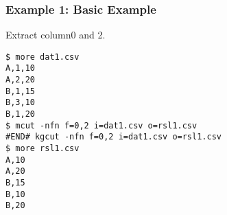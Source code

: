 \subsubsection*{Example 1: Basic Example}

Extract column0 and 2.


\begin{Verbatim}[baselinestretch=0.7,frame=single]
$ more dat1.csv
A,1,10
A,2,20
B,1,15
B,3,10
B,1,20
$ mcut -nfn f=0,2 i=dat1.csv o=rsl1.csv
#END# kgcut -nfn f=0,2 i=dat1.csv o=rsl1.csv
$ more rsl1.csv
A,10
A,20
B,15
B,10
B,20
\end{Verbatim}
